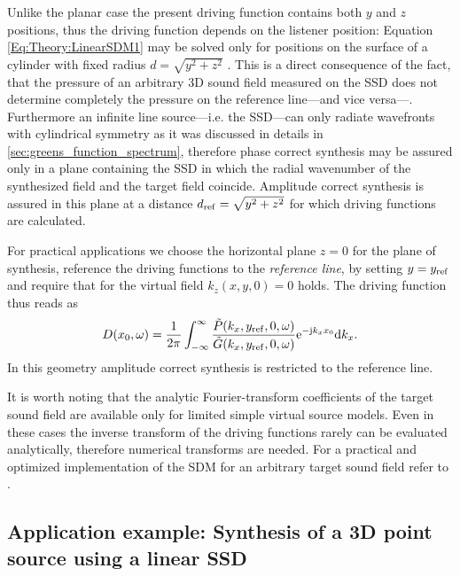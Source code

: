 \vspace{3mm}
Unlike the planar case the present driving function contains both $y$ and $z$ positions, thus the driving function depends on the listener position: Equation \eqref{Eq:Theory:LinearSDM1} may be solved only for positions on the surface of a cylinder with fixed radius $d = \sqrt{y^2 + z^2}$ \cite[p.~60.]{Ahrens2010phd}.
This is a direct consequence of the fact, that the pressure of an arbitrary 3D sound field measured on the SSD does not determine completely the pressure on the reference line---and vice versa---.
Furthermore an infinite line source---i.e. the SSD---can only radiate wavefronts with cylindrical symmetry as it was discussed in details in \ref{sec:greens_function_spectrum},
therefore phase correct synthesis may be assured only in a plane containing the SSD in which the radial wavenumber of the synthesized field and the target field coincide. 
Amplitude correct synthesis is assured in this plane at a distance $d_{\mathrm{ref}} = \sqrt{y^2 + z^2}$ for which driving functions are calculated.

For practical applications we choose the horizontal plane $z=0$ for the plane of synthesis, reference the driving functions to the \emph{reference line}, by setting $y = y_{\mathrm{ref}}$ and require that for the virtual field $k_z(x,y,0) = 0$ holds.
The driving function thus reads as
\begin{equation}
D(x_0,\omega) = \frac{1}{2\pi} \int_{-\infty}^{\infty} \frac{\tilde{P}(k_x,y_{\mathrm{ref}},0, \omega) }{\tilde{G}(k_x,y_{\mathrm{ref}},0, \omega)} \mathrm{e}^{-\mathrm{j} k_x x_0} \mathrm{d} k_x.
\label{Eq:Theory:Linear_SDM}
\end{equation}
In this geometry amplitude correct synthesis is restricted to the reference line.

\vspace{3mm}
It is worth noting that the analytic Fourier-transform coefficients of the target sound field are available only for limited simple virtual source models. 
Even in these cases the inverse transform of the driving functions rarely can be evaluated analytically, therefore numerical transforms are needed.
For a practical and optimized implementation of the SDM for an arbitrary target sound field refer to \cite{ahrens2013a:efficientSDM}.

\subsection*{Application example: Synthesis of a 3D point source using a linear SSD}

